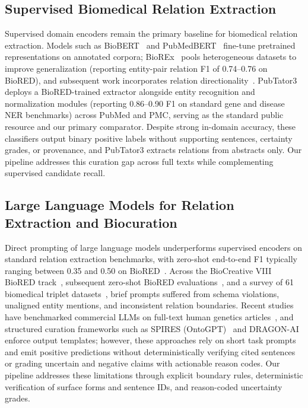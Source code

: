 \documentclass[preprint,10pt,letterpaper]{elsarticle}
\begin{document}
\subsection{Supervised Biomedical Relation Extraction}
Supervised domain encoders remain the primary baseline for biomedical relation extraction. Models such as BioBERT~\cite{lee2020biobert} and PubMedBERT~\cite{gu2021pubmedbert} fine-tune pretrained representations on annotated corpora; BioREx~\cite{lai2023biorex} pools heterogeneous datasets to improve generalization (reporting entity-pair relation F1 of 0.74--0.76 on BioRED), and subsequent work incorporates relation directionality~\cite{lai2025directionality}. PubTator3~\cite{wei2024pubtator3} deploys a BioRED-trained extractor alongside entity recognition and normalization modules (reporting 0.86--0.90 F1 on standard gene and disease NER benchmarks) across PubMed and PMC, serving as the standard public resource and our primary comparator. Despite strong in-domain accuracy, these classifiers output binary positive labels without supporting sentences, certainty grades, or provenance, and PubTator3 extracts relations from abstracts only. Our pipeline addresses this curation gap across full texts while complementing supervised candidate recall.

\subsection{Large Language Models for Relation Extraction and Biocuration}
Direct prompting of large language models underperforms supervised encoders on standard relation extraction benchmarks, with zero-shot end-to-end F1 typically ranging between 0.35 and 0.50 on BioRED~\cite{chen2025benchmarking,islamaj2024biocreative,brokman2025benchmark,gade2025benchmarking}. Across the BioCreative VIII BioRED track~\cite{islamaj2024biocreative}, subsequent zero-shot BioRED evaluations~\cite{brokman2025benchmark}, and a survey of 61 biomedical triplet datasets~\cite{gade2025benchmarking}, brief prompts suffered from schema violations, unaligned entity mentions, and inconsistent relation boundaries. Recent studies have benchmarked commercial LLMs on full-text human genetics articles~\cite{yin2026benchmarking}, and structured curation frameworks such as SPIRES (OntoGPT)~\cite{caufield2024spires} and DRAGON-AI~\cite{toro2024dragonai} enforce output templates; however, these approaches rely on short task prompts and emit positive predictions without deterministically verifying cited sentences or grading uncertain and negative claims with actionable reason codes. Our pipeline addresses these limitations through explicit boundary rules, deterministic verification of surface forms and sentence IDs, and reason-coded uncertainty grades.
\end{document}
